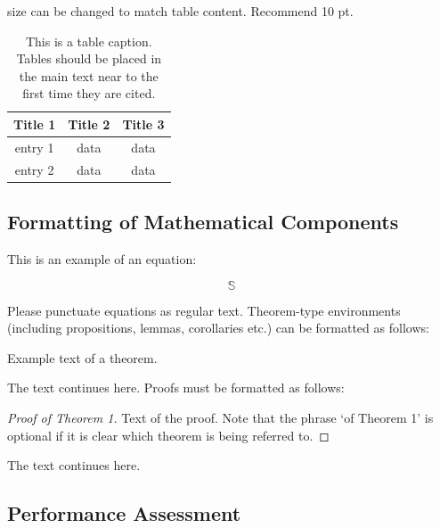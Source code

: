 \begin{table}[H]
  \caption{This is a table caption. Tables should be placed in the
    main text near to the first time they are cited.}  \small %
  size can be changed to match table content. Recommend 10 pt.
  \centering
  \begin{tabular}{ccc}
    \toprule \textbf{Title 1} & \textbf{Title 2} & \textbf{Title
      3}\\ \midrule entry 1 & data & data\\ entry 2 & data &
    data\\ \bottomrule
  \end{tabular}
\end{table}

\subsection{Formatting of Mathematical Components}

This is an example of an equation:

\begin{equation}
  \mathbb{S}
\end{equation}

Please punctuate equations as regular text. Theorem-type environments
(including propositions, lemmas, corollaries etc.) can be formatted as
follows:
\begin{Theorem}
  Example text of a theorem.
\end{Theorem}
The text continues here. Proofs must be formatted as follows:

\begin{proof}[Proof of Theorem 1]
  Text of the proof. Note that the phrase `of Theorem 1' is optional
  if it is clear which theorem is being referred to.
\end{proof}
The text continues here.  \fi

\subsection{Performance Assessment}

